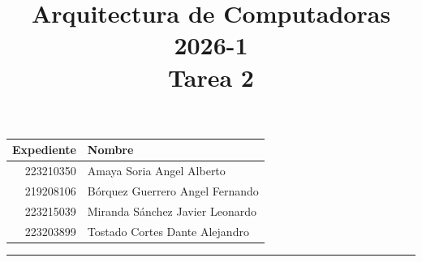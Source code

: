 \documentclass[a4paper, 11pt]{article}
\title
{
    Arquitectura de Computadoras 2026-1 \\
    Tarea 2
}
\begin{document}
    \maketitle

    \begin{center}
        \begin{tabular}{r|l}
            \textbf{Expediente} & \textbf{Nombre} \\ \hline
            223210350 & Amaya Soria Angel Alberto \\
            219208106 & Bórquez Guerrero Angel Fernando \\
            223215039 & Miranda Sánchez Javier Leonardo \\
            223203899 & Tostado Cortes Dante Alejandro
        \end{tabular}
    \end{center}

    \rule{\linewidth}{0.3mm}
\end{document}
